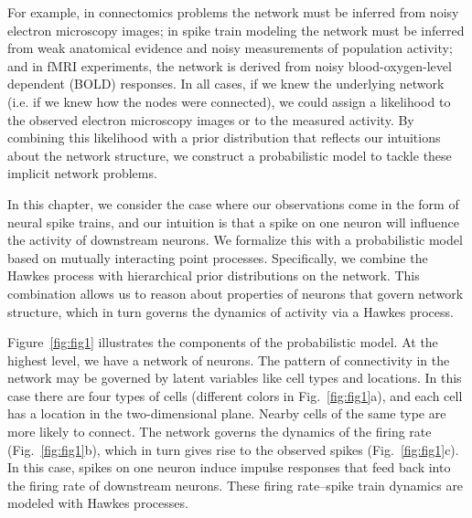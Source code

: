 For example, in connectomics problems the network must be inferred
from noisy electron microscopy images; in spike train modeling the
network must be inferred from weak anatomical evidence and noisy
measurements of population activity; and in fMRI experiments, the
network is derived from noisy blood-oxygen-level dependent (BOLD)
responses.  In all cases, if we knew the underlying network (i.e.  if
we knew how the nodes were connected), we could assign a likelihood to
the observed electron microscopy images or to the measured
activity. By combining this likelihood with a prior distribution that
reflects our intuitions about the network structure, we construct a
probabilistic model to tackle these implicit network problems.


In this chapter, we consider the case where our observations come in
the form of neural spike trains, and our intuition is that a spike on
one neuron will influence the activity of downstream neurons.  We formalize
this with a probabilistic model based on mutually interacting point
processes.  Specifically, we combine the Hawkes process
\citep{Hawkes-1971} with hierarchical prior distributions on the network.  This
combination allows us to reason about properties of neurons that govern
network structure, which in turn governs the dynamics of activity via
a Hawkes process. 

Figure~\ref{fig:fig1} illustrates the components of the
probabilistic model. At the highest level, we have a network of
neurons.  The pattern of connectivity in the network may be governed
by latent variables like cell types and locations. In this case there
are four types of cells (different colors in
Fig.~\ref{fig:fig1}a), and each cell has a location in the
two-dimensional plane. Nearby cells of the same type are more likely
to connect. The network governs the dynamics of the firing rate
(Fig.~\ref{fig:fig1}b), which in turn gives rise to the
observed spikes (Fig.~\ref{fig:fig1}c). In this case, spikes on
one neuron induce impulse responses that feed back into the firing
rate of downstream neurons. These firing rate--spike train dynamics are 
modeled with Hawkes processes. 


